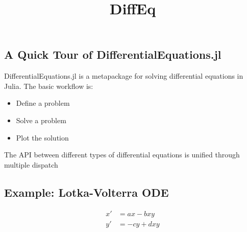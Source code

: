\documentclass[11pt]{article}
\title{DiffEq}
\begin{document}
    
    
    \maketitle
    
    

    
    \subsection{A Quick Tour of
DifferentialEquations.jl}\label{a-quick-tour-of-differentialequations.jl}

DifferentialEquations.jl is a metapackage for solving differential
equations in Julia. The basic workflow is:

\begin{itemize}
\itemsep1pt\parskip0pt
\item
  Define a problem
\item
  Solve a problem
\item
  Plot the solution
\end{itemize}

The API between different types of differential equations is unified
through multiple dispatch

    \subsection{Example: Lotka-Volterra
ODE}\label{example-lotka-volterra-ode}

\[\begin{align}
x' &= ax - bxy\\
y' &= -cy + dxy
\end{align}\]
\end{document}
